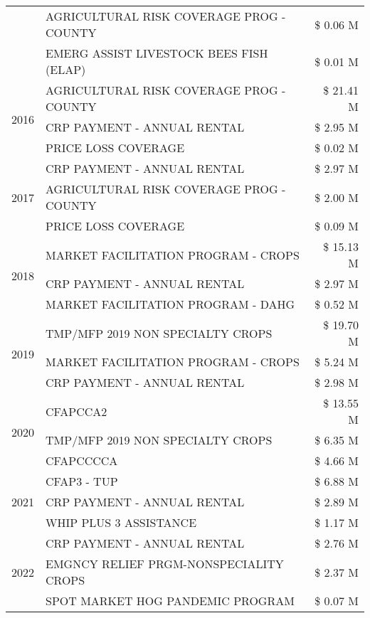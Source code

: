 \begin{tabular}{llr}
 & AGRICULTURAL RISK COVERAGE PROG - COUNTY & \$ 0.06 M \\
 & EMERG ASSIST LIVESTOCK BEES FISH (ELAP) & \$ 0.01 M \\
\cline{1-3}
\multirow[t]{3}{*}{2016} & AGRICULTURAL RISK COVERAGE PROG - COUNTY & \$ 21.41 M \\
 & CRP PAYMENT - ANNUAL RENTAL & \$ 2.95 M \\
 & PRICE LOSS COVERAGE & \$ 0.02 M \\
\cline{1-3}
\multirow[t]{3}{*}{2017} & CRP PAYMENT - ANNUAL RENTAL & \$ 2.97 M \\
 & AGRICULTURAL RISK COVERAGE PROG - COUNTY & \$ 2.00 M \\
 & PRICE LOSS COVERAGE & \$ 0.09 M \\
\cline{1-3}
\multirow[t]{3}{*}{2018} & MARKET FACILITATION PROGRAM - CROPS & \$ 15.13 M \\
 & CRP PAYMENT - ANNUAL RENTAL & \$ 2.97 M \\
 & MARKET FACILITATION PROGRAM - DAHG & \$ 0.52 M \\
\cline{1-3}
\multirow[t]{3}{*}{2019} & TMP/MFP 2019 NON SPECIALTY CROPS & \$ 19.70 M \\
 & MARKET FACILITATION PROGRAM - CROPS & \$ 5.24 M \\
 & CRP PAYMENT - ANNUAL RENTAL & \$ 2.98 M \\
\cline{1-3}
\multirow[t]{3}{*}{2020} & CFAPCCA2 & \$ 13.55 M \\
 & TMP/MFP 2019 NON SPECIALTY CROPS & \$ 6.35 M \\
 & CFAPCCCCA & \$ 4.66 M \\
\cline{1-3}
\multirow[t]{3}{*}{2021} & CFAP3 - TUP & \$ 6.88 M \\
 & CRP PAYMENT - ANNUAL RENTAL & \$ 2.89 M \\
 & WHIP PLUS 3 ASSISTANCE & \$ 1.17 M \\
\cline{1-3}
\multirow[t]{3}{*}{2022} & CRP PAYMENT - ANNUAL RENTAL & \$ 2.76 M \\
 & EMGNCY RELIEF PRGM-NONSPECIALITY CROPS & \$ 2.37 M \\
 & SPOT MARKET HOG PANDEMIC PROGRAM & \$ 0.07 M \\
\cline{1-3}
\bottomrule
\end{tabular}
